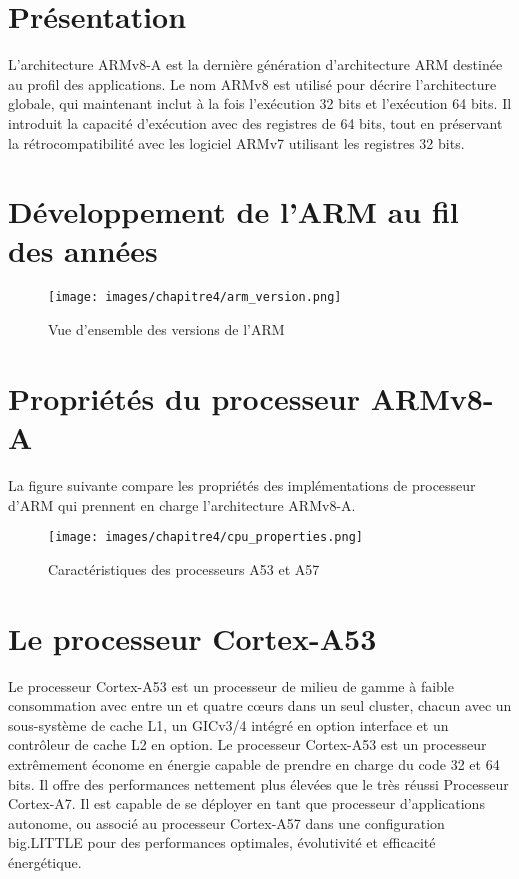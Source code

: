 \documentclass[12pt,a4paper,oneside]{book}
\begin{document}
	\section{Présentation}
	L'architecture ARMv8-A est la dernière génération d'architecture ARM destinée au profil des applications. Le nom ARMv8 est utilisé pour décrire l'architecture globale, qui maintenant
	inclut à la fois l'exécution 32 bits et l'exécution 64 bits. Il introduit la capacité d'exécution avec des registres de 64 bits, tout en préservant la rétrocompatibilité avec les logiciel ARMv7 utilisant les registres 32 bits. 
	
	\section{Développement de l'ARM au fil des années}
	
	\begin{figure}[H]
		\centering
		\texttt{[image: images/chapitre4/arm\_version.png]}
		\caption{Vue d'ensemble des versions de l'ARM}
		\label{Types}
	\end{figure}
	
	\section{Propriétés du processeur ARMv8-A}
	
	La figure suivante compare les propriétés des implémentations de processeur d'ARM qui prennent en charge l'architecture ARMv8-A.
	\begin{figure}[H]
		\centering
		\texttt{[image: images/chapitre4/cpu\_properties.png]}
		\caption{Caractéristiques des processeurs A53 et A57}
		\label{Types}
	\end{figure}	
	
	
	\section{Le processeur Cortex-A53}
	
	Le processeur Cortex-A53 est un processeur de milieu de gamme à faible consommation avec entre un et quatre cœurs dans un seul cluster, chacun avec un sous-système de cache L1, un GICv3/4 intégré en option interface et un contrôleur de cache L2 en option. Le processeur Cortex-A53 est un processeur extrêmement économe en énergie capable de prendre en charge du code 32 et 64 bits. Il offre des performances nettement plus élevées que le très réussi Processeur Cortex-A7. Il est capable de se déployer en tant que processeur d'applications autonome, ou associé au processeur Cortex-A57 dans une configuration big.LITTLE pour des performances optimales, évolutivité et efficacité énergétique.
	
\end{document}
